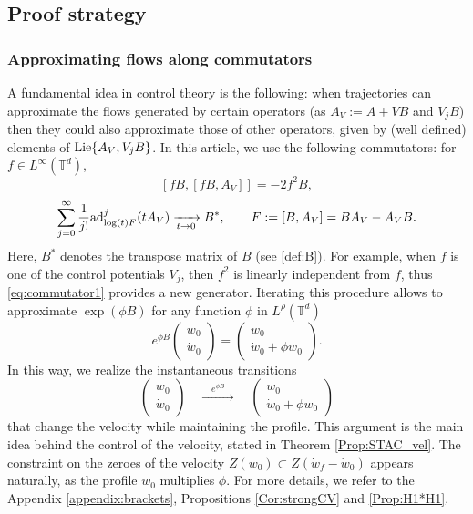 \documentclass[a4paper]{article}
\theoremstyle{plain}
\newcommand{\T}{\mathbb{T}}
\begin{document}
\subsection{Proof strategy}




\subsubsection{Approximating flows along commutators}

A fundamental idea in control theory is the following:
when trajectories can approximate the flows generated by certain operators (as $A_V:=A+VB$ and $V_j B$) then they could also approximate those of other operators, given by (well defined) elements of ${\rm Lie}\{A_V,V_jB\}$.
In this article, we use the following commutators: for $f \in L^{\infty}(\T^d)$,
\begin{equation}\label{eq:commutator1}
[f B,[f B,A_V]]=-2f^2B,
\end{equation}
%
\begin{equation}\label{eq:commutator2}
\sum_{j=0}^\infty
\frac{1}{j!}
{\rm ad}^j_{\log(t)F}(tA_V) \xrightarrow[t\to 0] {} B^*, \qquad F:=[B,A_V]=BA_V-A_VB.
\end{equation}
Here, $B^*$ denotes the transpose matrix of $B$ (see \eqref{def:B}). For example, when $f$ is one of the control potentials $V_j$, then $f^2$ is linearly independent from $f$, thus  \eqref{eq:commutator1} provides a new generator.
Iterating this procedure allows to 
approximate $\exp(\phi B)$ for any function $\phi$ in $L^\rho(\T^d)$
\begin{equation}\label{eq:flow-of-B}
e^{\phi B}\begin{pmatrix}
    w_0 \\ \dot{w}_0
\end{pmatrix}
=
 \begin{pmatrix}
    w_0 \\ \dot{w}_0+\phi w_0
\end{pmatrix}.
\end{equation}
In this way, we realize the instantaneous transitions
\begin{equation} \label{exp(phiB)_target}
    \begin{pmatrix}
    w_0 \\ \dot{w}_0
\end{pmatrix}
\quad \xrightarrow[]{\quad e^{\phi B} \quad }  \quad
 \begin{pmatrix}
    w_0 \\ \dot{w}_0+\phi w_0
\end{pmatrix}
\end{equation}
that change the velocity while maintaining the profile. This argument is the main idea behind the control of the velocity, stated in Theorem \ref{Prop:STAC_vel}.
The constraint on the zeroes of the velocity $Z(w_0) \subset Z(\dot{w}_f-\dot{w}_0)$ appears naturally, as the profile $w_0$ multiplies $\phi$. For more details, we refer to the Appendix \ref{appendix:brackets}, Propositions \ref{Cor:strongCV} and \ref{Prop:H1*H1}.
\end{document}
